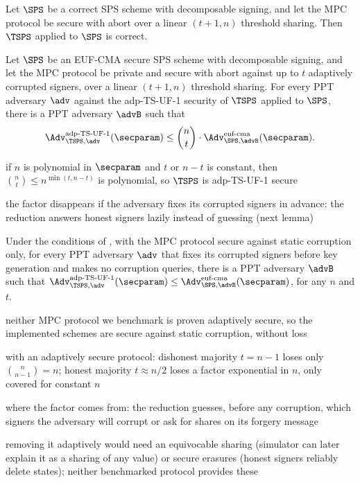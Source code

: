 \begin{lemma}\label{lem:tsps-construction-correctness} Let $\SPS$ be a correct SPS
scheme with decomposable signing, and let the MPC protocol be secure with abort
over a linear $(t+1, n)$ threshold sharing. Then $\TSPS$ applied to $\SPS$ is
correct.
\end{lemma}

\begin{theorem}\label{thm:tsps-construction-security} Let $\SPS$ be an EUF-CMA
secure SPS scheme with decomposable signing, and let the MPC protocol be private
and secure with abort against up to $t$ adaptively corrupted signers, over a
linear $(t+1, n)$ threshold sharing. For every PPT adversary $\adv$ against the
adp-TS-UF-1 security of $\TSPS$ applied to $\SPS$, there is a PPT adversary
$\advB$ such that
  \begin{equation*}
    \Adv_{\TSPS, \adv}^{\text{adp-TS-UF-1}}(\secparam) \leq \binom{n}{t}
\cdot \Adv_{\SPS, \advB}^{\text{euf-cma}}(\secparam).
  \end{equation*}
\end{theorem}

\begin{outline}
  \item if $n$ is polynomial in $\secparam$ and $t$ or $n - t$ is constant, then
$\binom{n}{t} \leq n^{\min(t, n-t)}$ is polynomial, so $\TSPS$ is adp-TS-UF-1
secure
  \item the factor disappears if the adversary fixes its corrupted signers in
advance: the reduction answers honest signers lazily instead of guessing (next
lemma)
\end{outline}

\begin{lemma}\label{lem:tsps-static} Under the conditions of
, with the MPC protocol secure against static
corruption only, for every PPT adversary $\adv$ that fixes
its corrupted signers before key generation and makes no corruption queries,
there is a PPT adversary $\advB$ such that
$\Adv_{\TSPS, \adv}^{\text{adp-TS-UF-1}}(\secparam) \leq
\Adv_{\SPS, \advB}^{\text{euf-cma}}(\secparam)$, for any $n$ and $t$.
\end{lemma}

\begin{outline}
  \item neither MPC protocol we benchmark is proven adaptively secure, so the
implemented schemes are secure against static corruption, without loss
  \item with an adaptively secure protocol: dishonest majority $t = n-1$ loses
only $\binom{n}{n-1} = n$; honest majority $t \approx n/2$ loses a factor
exponential in $n$, only covered for constant $n$
  \item where the factor comes from: the reduction guesses, before any
corruption, which signers the adversary will corrupt or ask for shares on its
forgery message
  \item removing it adaptively would need an equivocable sharing (simulator can
later explain it as a sharing of any value) or secure erasures (honest signers
reliably delete states); neither benchmarked protocol provides these
\end{outline}
